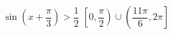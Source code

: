 { $\sin \left( x + \dfrac{\pi}{3} \right) > \dfrac{1}{2}$}
{ $\left[ 0, \dfrac{\pi}{2} \right) \cup \left( \dfrac{11\pi}{6}, 2\pi \right]$}
